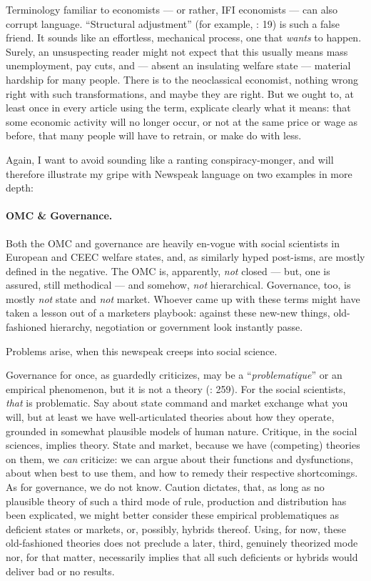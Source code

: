 Terminology familiar to economists --- or rather, \gls{IFI} economists --- can also corrupt language. ``Structural adjustment'' (for example, \citealt{Begg2008}: 19) is such a false friend. It sounds like an effortless, mechanical process, one that \emph{wants} to happen. Surely, an unsuspecting reader might not expect that this usually means mass unemployment, pay cuts, and --- absent an insulating welfare state --- material hardship for many people. There is to the neoclassical economist, nothing wrong right with such transformations, and maybe they are right. But we ought to, at least once in every article using the term, explicate clearly what it means: that some economic activity will no longer occur, or not at the same price or wage as before, that many people will have to retrain, or make do with less.

Again, I want to avoid sounding like a ranting conspiracy-monger, and will therefore illustrate my gripe with Newspeak language on two examples in more depth:

\paragraph{\gls{OMC} \& Governance.} Both the \gls{OMC} and governance are heavily en-vogue with social scientists in European and \gls{CEEC} welfare states, and, as similarly hyped post-isms, are mostly defined in the negative. The \gls{OMC} is, apparently, \emph{not} closed --- but, one is assured, still methodical --- and somehow, \emph{not} hierarchical. Governance, too, is mostly \emph{not} state and \emph{not} market. Whoever came up with these terms might have taken a lesson out of a marketers playbook: against these new-new things, old-fashioned hierarchy, negotiation or government look instantly passe.

Problems arise, when this newspeak creeps into social science.

Governance for once, as \citeauthor{Jachtenfuchs2001} guardedly criticizes, may be a ``\emph{problematique}'' or an empirical phenomenon, but it is not a theory (\citeyear{Jachtenfuchs2001}: 259). For the social scientists, \emph{that} is problematic. Say about state command and market exchange what you will, but at least we have well-articulated theories about how they operate, grounded in somewhat plausible models of human nature. Critique, in the social sciences, implies theory. State and market, because we have (competing) theories on them, we \emph{can} criticize: we can argue about their functions and dysfunctions, about when best to use them, and how to remedy their respective shortcomings. As for governance, we do not know. Caution dictates, that, as long as no plausible theory of such a third mode of rule, production and distribution has been explicated, we might better consider these empirical problematiques as deficient states or markets, or, possibly, hybrids thereof. Using, for now, these old-fashioned theories does not preclude a later, third, genuinely theorized mode nor, for that matter, necessarily implies that all such deficients or hybrids would deliver bad or no results.

